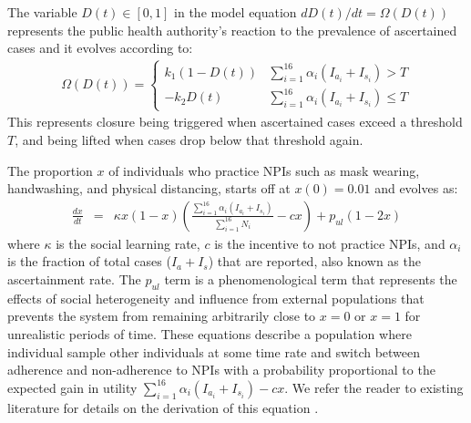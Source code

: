 The variable $D(t) \in [0,1]$ in the model equation $dD(t)/dt = \Omega(D(t))$ represents the public health authority's reaction to the prevalence of ascertained cases and it evolves according to: 
\begin{eqnarray}
  \Omega(D(t)) =  \left\{
\begin{array}{ll}
    k_1 (1 - D(t)) &  \sum_{i=1}^{16}\alpha_i(I_{a_i} + I_{s_i}) > T\\
    - k_2 D(t) & \sum_{i=1}^{16}\alpha_i(I_{a_i} + I_{s_i}) \leq T
\end{array} 
\right. 
\end{eqnarray}
This represents closure being triggered when ascertained cases exceed a threshold $T$, and being lifted when cases drop below that threshold again. 

The proportion $x$ of individuals who practice NPIs such as mask wearing, handwashing, and physical distancing, starts off at $x(0)=0.01$ and evolves as: 
\begin{eqnarray}
\frac{dx}{dt} &= &\kappa x (1-x) \left(\frac{\sum_{i=1}^{16}\alpha_i(I_{a_i} + I_{s_i})}{\sum_{i=1}^{16} N_i} - c x\right) + p_{ul}(1-2 x) 
\label{xeqn_new}
\end{eqnarray}
where $\kappa$ is the social learning rate, $c$ is the incentive to not practice NPIs, and $\alpha_i$ is the fraction of total cases ($I_a + I_s$) that are reported, also known as the ascertainment rate.  The $p_{ul}$ term is a phenomenological term that represents the effects of social heterogeneity and influence from external populations that prevents the system from remaining arbitrarily close to $x=0$ or $x=1$ for unrealistic periods of time.  These equations describe a population where individual sample other individuals at some time rate and switch between adherence and non-adherence to NPIs with a probability proportional to the expected gain in utility $\sum_{i=1}^{16}\alpha_i(I_{a_i} + I_{s_i}) - c x$. We refer the reader to existing literature for details on the derivation of this equation \cite{bauch2005imitation,innes2013impact,thampi2018socio,bauch2012evolutionary,oraby2014influence}. 

